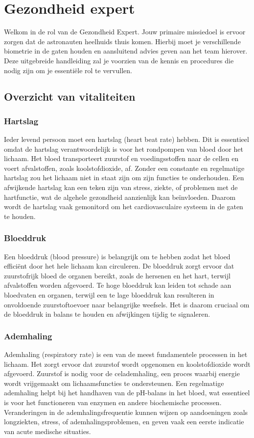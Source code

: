 \section{Gezondheid expert}

Welkom in de rol van de Gezondheid Expert. Jouw primaire missiedoel is ervoor zorgen dat de astronauten heelhuids thuis komen. Hierbij moet je verschillende biometrie in de gaten houden en aansluitend advies geven aan het team hierover. Deze uitgebreide handleiding zal je voorzien van de kennis en procedures die nodig zijn om je essentiële rol te vervullen.

\subsection{Overzicht van vitaliteiten}

\subsubsection{Hartslag}
Ieder levend persoon moet een hartslag (heart beat rate) hebben. Dit is essentieel omdat de hartslag verantwoordelijk is voor het rondpompen van bloed door het lichaam. Het bloed transporteert zuurstof en voedingsstoffen naar de cellen en voert afvalstoffen, zoals koolstofdioxide, af. Zonder een constante en regelmatige hartslag zou het lichaam niet in staat zijn om zijn functies te onderhouden. Een afwijkende hartslag kan een teken zijn van stress, ziekte, of problemen met de hartfunctie, wat de algehele gezondheid aanzienlijk kan beïnvloeden. Daarom wordt de hartslag vaak gemonitord om het cardiovasculaire systeem in de gaten te houden.

\subsubsection{Bloeddruk}
Een bloeddruk (blood pressure) is belangrijk om te hebben zodat het bloed efficiënt door het hele lichaam kan circuleren. De bloeddruk zorgt ervoor dat zuurstofrijk bloed de organen bereikt, zoals de hersenen en het hart, terwijl afvalstoffen worden afgevoerd. Te hoge bloeddruk kan leiden tot schade aan bloedvaten en organen, terwijl een te lage bloeddruk kan resulteren in onvoldoende zuurstoftoevoer naar belangrijke weefsels. Het is daarom cruciaal om de bloeddruk in balans te houden en afwijkingen tijdig te signaleren.

\subsubsection{Ademhaling}
Ademhaling (respiratory rate) is een van de meest fundamentele processen in het lichaam. Het zorgt ervoor dat zuurstof wordt opgenomen en koolstofdioxide wordt afgevoerd. Zuurstof is nodig voor de celademhaling, een proces waarbij energie wordt vrijgemaakt om lichaamsfuncties te ondersteunen. Een regelmatige ademhaling helpt bij het handhaven van de pH-balans in het bloed, wat essentieel is voor het functioneren van enzymen en andere biochemische processen. Veranderingen in de ademhalingsfrequentie kunnen wijzen op aandoeningen zoals longziekten, stress, of ademhalingsproblemen, en geven vaak een eerste indicatie van acute medische situaties.

